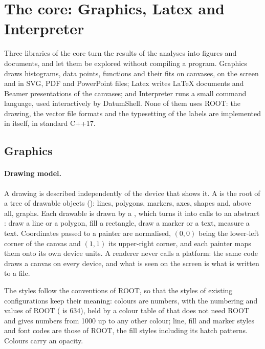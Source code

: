 \section{The core: Graphics, Latex and Interpreter}
\label{sec:graphics}

Three libraries of the core turn the results of the analyses into figures and documents, and let them be explored
without compiling a program. Graphics draws histograms, data points, functions and their fits on canvases, on the
screen and in SVG, PDF and PowerPoint files; Latex writes \LaTeX{} documents and Beamer presentations of the canvases;
and Interpreter runs a small command language, used interactively by DatumShell. None of them uses ROOT: the drawing,
the vector file formats and the typesetting of the labels are implemented in \Datum{} itself, in standard C++17.

\subsection{Graphics}
\label{sec:graphicscore}

\paragraph{Drawing model.}
A drawing is described independently of the device that shows it. A  is the root of a tree of drawable
objects (): lines, polygons, markers, axes, shapes and, above all, graphs. Each drawable is drawn by
a , which turns it into calls to an abstract : draw a line or a polygon, fill a rectangle,
draw a marker or a text, measure a text. Coordinates passed to a painter are normalised, $(0,0)$ being the lower-left
corner of the canvas and $(1,1)$ its upper-right corner, and each painter maps them onto its own device units. A
renderer never calls a platform: the same code draws a canvas on every device, and what is seen on the
screen is what is written to a file.

The styles follow the conventions of ROOT, so that the styles of existing configurations keep their meaning: colours
are numbers, with the numbering and values of ROOT ( is 634), held by a colour table of \Datum{} that does
not need ROOT and gives numbers from 1000 up to any other colour; line, fill and marker styles and font codes are
those of ROOT, the fill styles including its hatch patterns. Colours carry an opacity.

